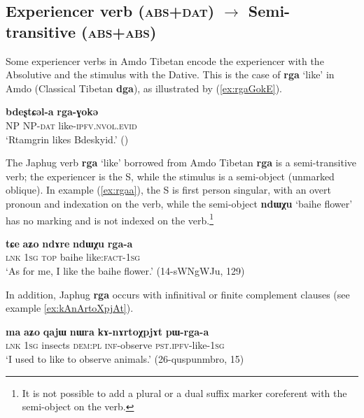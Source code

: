 \documentclass[oneside,a4paper,11pt]{article}
\newcommand{\ipa}[1]{{\phon\textbf{\mbox{#1}}}} %
\newcommand{\refb}[1]{(\ref{#1})}
\begin{document}
\subsection{Experiencer verb (\textsc{abs+dat}) $\rightarrow$ Semi-transitive (\textsc{abs+abs})}
Some experiencer verbs in Amdo Tibetan encode the experiencer with the Absolutive and the stimulus with the Dative. This is the case of \ipa{rga} `like' in Amdo (Classical Tibetan \ipa{dga}), as illustrated by \refb{ex:rgaGokE}.

\begin{exe}
\ex \label{ex:rgaGokE}
\gll \ipa{ʂtamɖʐən}  \ipa{bdeʂtɕəl-a}  \ipa{rga-ɣokə} \\
NP NP-\textsc{dat} like-\textsc{ipfv.nvol.evid} \\
\glt `Rtamgrin likes Bdeskyid.' (\citealt[123, ex. 547]{haller04themchen})
\end{exe}

The Japhug verb \ipa{rga} `like' borrowed from Amdo Tibetan \ipa{rga} is a semi-transitive verb; the experiencer is the S, while the stimulus is a semi-object (unmarked oblique). In example \refb{ex:rgaa}, the S is first person singular,  with an overt pronoun and indexation on the verb, while the semi-object \ipa{ndɯχu} `baihe flower' has no marking and is not indexed on the verb.\footnote{It is not possible to add a plural or a dual suffix marker coreferent with the semi-object on the verb.}  

\begin{exe}
\ex \label{ex:rgaa}
\gll
\ipa{tɕe} 	\ipa{aʑo} 	\ipa{ndɤre} 	\ipa{ndɯχu} 	\ipa{rga-a} \\
\textsc{lnk} \textsc{1sg} \textsc{top} baihe like:\textsc{fact}-\textsc{1sg} \\
\glt `As for me, I like the baihe flower.' (14-sWNgWJu, 129)
\end{exe}


In addition, Japhug \ipa{rga}  occurs with infinitival or finite complement clauses (see example \ref{ex:kAnArtoXpjAt}).

\begin{exe}
\ex \label{ex:kAnArtoXpjAt}
\gll  
\ipa{ma} 	\ipa{aʑo} 	\ipa{qajɯ} 	\ipa{nɯra} 	\ipa{kɤ-nɤrtoχpjɤt} 	\ipa{pɯ-rga-a} \\
\textsc{lnk} \textsc{1sg} insects \textsc{dem:pl} \textsc{inf}-observe \textsc{pst.ipfv}-like-\textsc{1sg} \\
\glt `I used to like to observe animals.' (26-quspunmbro, 15)
\end{exe}
\end{document}

